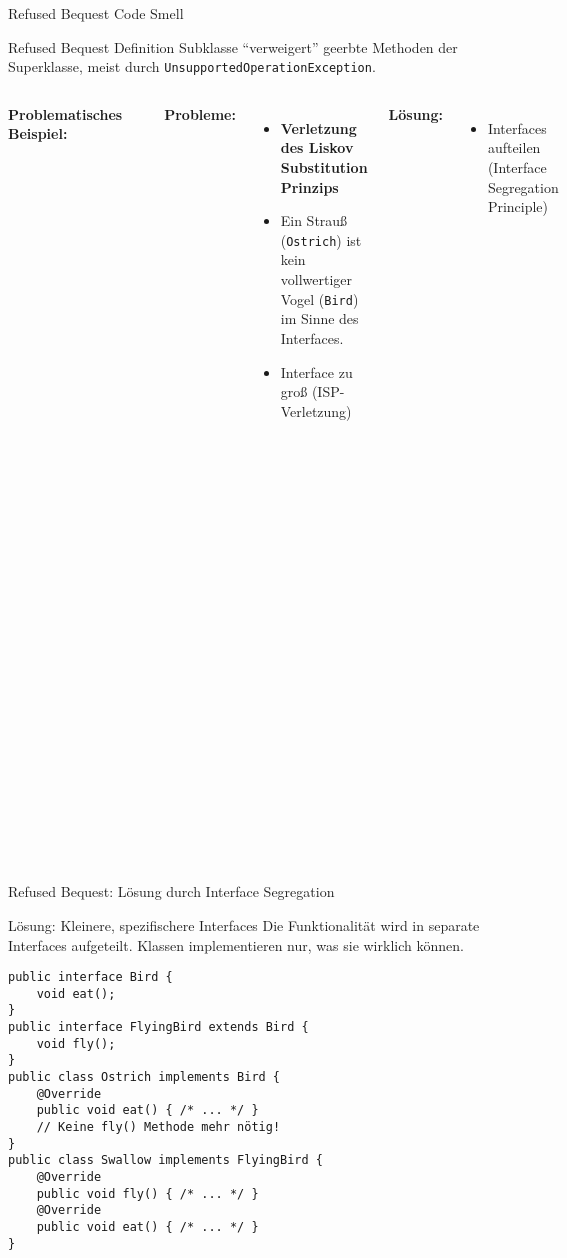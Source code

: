 \begin{frame}[fragile]{Refused Bequest Code Smell}
  \begin{exampleblock}{Refused Bequest Definition}
    Subklasse ``verweigert'' geerbte Methoden der Superklasse, meist durch \texttt{UnsupportedOperationException}.
  \end{exampleblock}
  \begin{columns}[T]
    \textbf{Problematisches Beispiel:}
    \begin{lstlisting}[style=java, basicstyle=\tiny\ttfamily]
public interface Bird {
    void fly();
    void eat();
}

public class Ostrich implements Bird {
    @Override
    public void fly() {
        throw new UnsupportedOperationException();
    }

    @Override
    public void eat() {
        // ...
    }
}
    \end{lstlisting}
    \textbf{Probleme:}
    \begin{itemize}
      \item \textbf{Verletzung des Liskov Substitution Prinzips}
      \item Ein Strauß (\texttt{Ostrich}) ist kein vollwertiger Vogel (\texttt{Bird}) im Sinne des Interfaces.
      \item Interface zu groß (ISP-Verletzung)
    \end{itemize}
    \textbf{Lösung:}
    \begin{itemize}
        \item Interfaces aufteilen (Interface Segregation Principle)
    \end{itemize}
  \end{columns}
\end{frame}


\begin{frame}[fragile]{Refused Bequest: Lösung durch Interface Segregation}
  \begin{exampleblock}{Lösung: Kleinere, spezifischere Interfaces}
    Die Funktionalität wird in separate Interfaces aufgeteilt. Klassen implementieren nur, was sie wirklich können.
  \end{exampleblock}
    \begin{lstlisting}[style=java, basicstyle=\tiny\ttfamily]
public interface Bird {
    void eat();
}
public interface FlyingBird extends Bird {
    void fly();
}
public class Ostrich implements Bird {
    @Override
    public void eat() { /* ... */ }
    // Keine fly() Methode mehr nötig!
}
public class Swallow implements FlyingBird {
    @Override
    public void fly() { /* ... */ }
    @Override
    public void eat() { /* ... */ }
}
    \end{lstlisting}
\end{frame}


